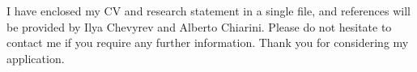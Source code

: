 \documentclass[11pt,a4paper]{moderncv}
\begin{document}
I have enclosed my CV and research statement in a single file, and references will be provided by Ilya Chevyrev and Alberto Chiarini. Please do not hesitate to contact me if you require any further information. Thank you for considering my application.






\vspace{0.5cm}

\makeletterclosing
\end{document}
